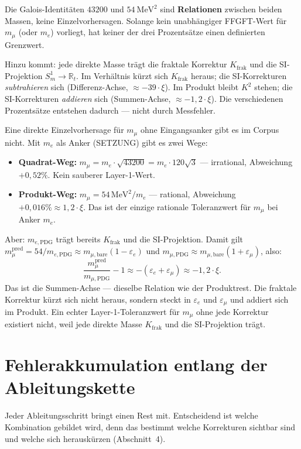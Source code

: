 Die Galois-Identitäten $43200$ und $54~\text{MeV}^2$ sind
\textbf{Relationen} zwischen beiden Massen, keine Einzelvorhersagen.
Solange kein unabhängiger FFGFT-Wert für $m_\mu$ (oder $m_e$)
vorliegt, hat keiner der drei Prozentsätze einen definierten
Grenzwert.

Hinzu kommt: jede direkte Masse trägt die fraktale Korrektur
$K_\text{frak}$ und die SI-Projektion $S^1_m\to\mathbb{R}_t$.
Im Verhältnis kürzt sich $K_\text{frak}$ heraus; die SI-Korrekturen
\emph{subtrahieren} sich (Differenz-Achse, $\approx -39\cdot\xi$).
Im Produkt bleibt $K^2$ stehen; die SI-Korrekturen \emph{addieren}
sich (Summen-Achse, $\approx -1{,}2\cdot\xi$). Die verschiedenen
Prozentsätze entstehen dadurch --- nicht durch Messfehler.

Eine direkte Einzelvorhersage für $m_\mu$ ohne Eingangsanker gibt es
im Corpus nicht. Mit $m_e$ als Anker (SETZUNG) gibt es zwei Wege:
\begin{itemize}\itemsep2pt
\item \textbf{Quadrat-Weg:} $m_\mu = m_e\cdot\sqrt{43200} = m_e\cdot120\sqrt{3}$ ---
  irrational, Abweichung $+0{,}52\%$. Kein sauberer Layer-1-Wert.
\item \textbf{Produkt-Weg:} $m_\mu = 54\,\text{MeV}^2/m_e$ --- rational,
  Abweichung $+0{,}016\%\approx1{,}2\cdot\xi$. Das ist der einzige
  rationale Toleranzwert für $m_\mu$ bei Anker $m_e$.
\end{itemize}
Aber: $m_{e,\text{PDG}}$ trägt bereits $K_\text{frak}$ und die SI-Projektion.
Damit gilt $m_\mu^\text{pred}=54/m_{e,\text{PDG}}\approx m_{\mu,\text{bare}}(1-\varepsilon_e)$
und $m_{\mu,\text{PDG}}\approx m_{\mu,\text{bare}}(1+\varepsilon_\mu)$, also:
\[
\frac{m_\mu^\text{pred}}{m_{\mu,\text{PDG}}}-1
\approx -(\varepsilon_e+\varepsilon_\mu) \approx -1{,}2\cdot\xi .
\]
Das ist die Summen-Achse --- dieselbe Relation wie der Produktrest.
Die fraktale Korrektur kürzt sich nicht heraus, sondern steckt in
$\varepsilon_e$ und $\varepsilon_\mu$ und addiert sich im Produkt.
Ein echter Layer-1-Toleranzwert für $m_\mu$ ohne jede Korrektur
existiert nicht, weil jede direkte Masse $K_\text{frak}$ und die
SI-Projektion trägt.

\section{Fehlerakkumulation entlang der Ableitungskette}

Jeder Ableitungsschritt bringt einen Rest mit. Entscheidend ist welche
Kombination gebildet wird, denn das bestimmt welche Korrekturen sichtbar sind
und welche sich herauskürzen (Abschnitt~4).

